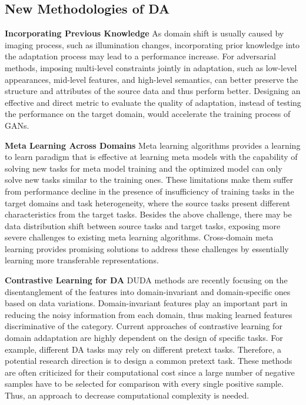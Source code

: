 \documentclass[conference]{IEEEtran}
\begin{document}
\subsection{New Methodologies of DA}
\textbf{Incorporating Previous Knowledge} As domain shift is usually caused
by imaging process, such as illumination changes, incorporating prior knowledge into
the adaptation process may lead to a performance increase.
For adversarial methods, imposing multi-level constraints jointly in adaptation,
such as low-level appearances, mid-level features, and high-level semantics, 
can better preserve the structure and attributes of the source data and thus 
perform better.
Designing an effective and direct metric to evaluate the quality of adaptation,
instead of testing the performance on the target domain, would accelerate the training 
process of GANs.

\textbf{Meta Learning Across Domains} Meta learning algorithms provides a learning
to learn paradigm that is effective at learning meta models with the capability of solving new
tasks for meta model training and the optimized model can only solve new tasks similar to the training ones.
These limitations make them suffer from performance decline in the presence of insufficiency
of training tasks in the target domains and task heterogeneity, where the source
tasks present different characteristics from the target tasks.
Besides the above challenge, there may be data distribution shift between source
tasks and target tasks, exposing more severe challenges to existing meta learning 
algorithms. 
Cross-domain meta learning provides promising solutions to address these challenges 
by essentially learning more transferable representations.

\textbf{Contrastive Learning for DA} DUDA methods are recently focusing on the disentanglement
of the features into domain-invariant and domain-specific ones based on data variations.
Domain-invariant features play an important part in reducing the noisy information from each domain,
thus making learned features discriminative of the category.
Current approaches of contrastive learning for domain addaptation are highly dependent
on the design of specific tasks. 
For example, different DA tasks may rely on different pretext tasks. 
Therefore, a potential research direction is to design a common pretext task.
These methods are often criticized for their computational cost since a large 
number of negative samples have to be selected for comparison with every single 
positive sample. Thus, an approach to decrease computational complexity is needed.



\end{document}
